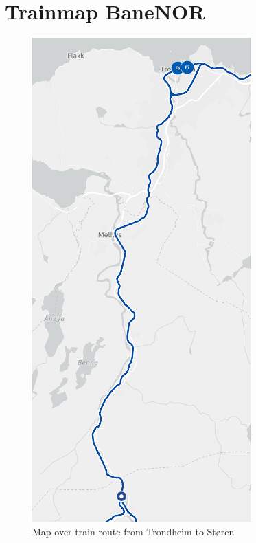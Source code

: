 \chapter{Trainmap BaneNOR}
\label{app:jlscicomp}

\begin{figure}[h]
    \centering
    \includegraphics[scale=0.5]{figures/togkart.png}
    \caption{Map over train route from Trondheim to Støren}
    \label{fig:trainmap}
\end{figure}